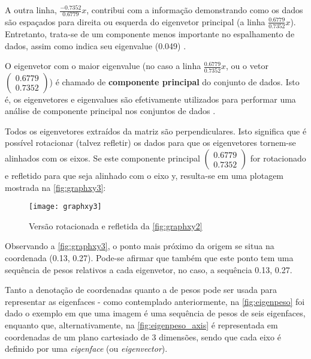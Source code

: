 A outra linha, $\frac{-0.7352}{0.6779}$$x$, contribui com a informação demonstrando como os dados são espaçados para direita ou esquerda do eigenvetor principal (a linha $\frac{0.6779}{0.7352}$$x$). Entretanto, trata-se de um componente menos importante no espalhamento de dados, assim como indica seu eigenvalue (0.049) \cite{drmathew_java_programming}.

O eigenvetor com o maior eigenvalue (no caso a linha $\frac{0.6779}{0.7352}$$x$, ou o vetor $\begin{pmatrix} 0.6779 \\ 0.7352 \end{pmatrix}$) é chamado de \textbf{componente principal} do conjunto de dados. Isto é, os eigenvetores e eigenvalues são efetivamente utilizados para performar uma análise de componente principal nos conjuntos de dados \cite{drmathew_java_programming}.

Todos os eigenvetores extraídos da matriz são perpendiculares. Isto significa que é possível rotacionar (talvez refletir) os dados para que os eigenvetores tornem-se alinhados com os eixos. Se este componente principal $\begin{pmatrix} 0.6779 \\ 0.7352 \end{pmatrix}$ for rotacionado e refletido para que seja alinhado com o eixo y, resulta-se em uma plotagem mostrada na \autoref{fig:graphxy3}:

\begin{figure}[h]
	\centering
	\texttt{[image: graphxy3]}
	\caption{Versão rotacionada e refletida da \autoref{fig:graphxy2}}
	\label{fig:graphxy3}
\end{figure}

Observando a \autoref{fig:graphxy3}, o ponto mais próximo da origem se situa na coordenada (0.13, 0.27). Pode-se afirmar que também que este ponto tem uma sequência de pesos relativos a cada eigenvetor, no caso, a sequência {0.13, 0.27}.

Tanto a denotação de coordenadas quanto a de pesos pode ser usada para representar as eigenfaces - como contemplado anteriormente, na \autoref{fig:eigenpeso} foi dado o exemplo em que uma imagem é uma sequência de pesos de seis eigenfaces, enquanto que, alternativamente, na  \autoref{fig:eigenpeso_axis} é representada em coordenadas de um plano cartesiado de 3 dimensões, sendo que cada eixo é definido por uma \textit{eigenface} (ou \textit{eigenvector}).

